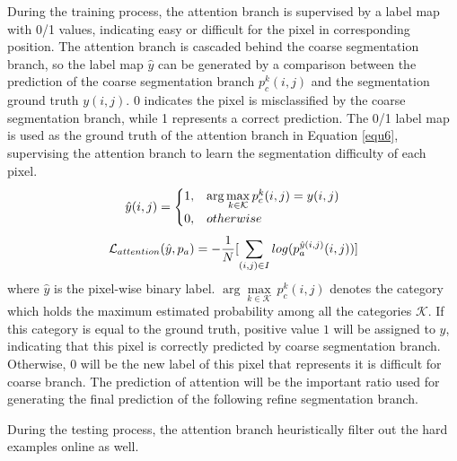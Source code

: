 \documentclass[10.5pt,compsoc]{TsT}
\theoremstyle{mystyle}
\begin{document}
{During the training process, the attention branch is supervised by a label map with 0/1 values, indicating  easy or difficult for the pixel in corresponding position. The attention branch is cascaded behind the coarse segmentation branch, so the label map $\hat{y}$ can be generated by a comparison between the prediction of the coarse segmentation branch $p_{c}^k(i,j)$ and the segmentation ground truth $y(i,j)$. 0 indicates the pixel is misclassified by the coarse segmentation branch, while 1 represents a correct prediction. The 0/1 label map is used as the ground truth of the attention branch in Equation \ref{equ6}, supervising the attention branch to learn the segmentation difficulty of each pixel.
\begin{equation}\label{equ5}
\setlength\abovedisplayskip{8pt}
\setlength\belowdisplayskip{8pt}
\begin{split}
\hat{y}(i,j) = 
\begin{cases}
1, &\arg\underset{k \in \mathcal{K}}{\max}\,p_{c}^k(i,j)=y(i,j)\\
0, &otherwise
\end{cases}
\end{split}
\end{equation} 
\begin{equation}\label{equ6}
\setlength\abovedisplayskip{8pt}
\setlength\belowdisplayskip{8pt}
\begin{split}
\mathcal{L}_{attention}(\hat{y}, p_a) = - \frac{1}{N}[\sum_{(i,j)\in I}log(p^{\hat{y}(i,j)}_a(i,j))]\\
\end{split}
\end{equation}
where $\hat{y}$ is the pixel-wise binary label. $\arg\underset{k \in \mathcal{K}}{\max}\,p_{c}^k(i,j)$ denotes the category which holds the maximum estimated probability among all the categories $\mathcal{K}$. If this category is equal to the ground truth, positive value $1$ will be assigned to $\hat{y}$, indicating that this pixel is correctly predicted by coarse segmentation branch. Otherwise, $0$ will be the new label of this pixel that represents it is difficult for coarse branch. The prediction of attention will be the important ratio used for generating the final prediction of the following refine segmentation branch.

During the testing process, the attention branch heuristically filter out the hard examples online as well.



}
\end{document}
